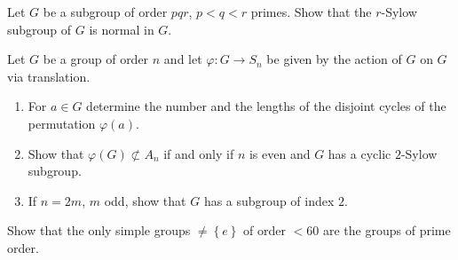 \begin{problem}
  Let \(G\) be a subgroup of order \(pqr\), \(p<q<r\) primes. Show that the
  \(r\)-Sylow subgroup of \(G\) is normal in \(G\).
\end{problem}
\begin{solution}
\end{solution}

\begin{problem}
  Let \(G\) be a group of order \(n\) and let \(\varphi\colon G\to S_n\) be
  given by the action of \(G\) on \(G\) via translation.
  \begin{enumerate}[label=(\alph*),noitemsep]
  \item For \(a\in G\) determine the number and the lengths of the disjoint
    cycles of the permutation \(\varphi(a)\).
  \item Show that \(\varphi(G)\nsubset A_n\) if and only if \(n\) is even
    and \(G\) has a cyclic \(2\)-Sylow subgroup.
  \item If \(n=2m\), \(m\) odd, show that \(G\) has a subgroup of index
    \(2\).
  \end{enumerate}
\end{problem}
\begin{solution}
\end{solution}

\begin{problem}
  Show that the only simple groups \(\neq\left\{e\right\}\) of order
  \(<60\) are the groups of prime order.
\end{problem}
\begin{solution}
\end{solution}

